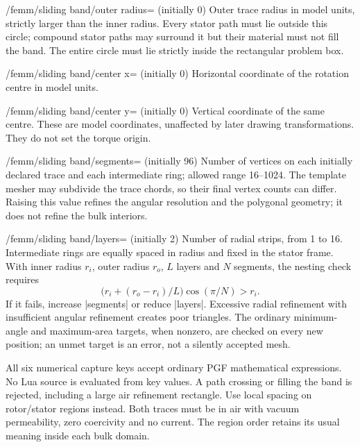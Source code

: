 \begin{key}{/femm/sliding band/outer radius= (initially 0)}
Outer trace radius in model units, strictly larger than the inner radius.
Every stator path must lie outside this circle; compound stator paths may
surround it but their material must not fill the band. The entire circle must
lie strictly inside the rectangular problem box.
\end{key}
\begin{key}{/femm/sliding band/center x= (initially 0)}
Horizontal coordinate of the rotation centre in model units.
\end{key}
\begin{key}{/femm/sliding band/center y= (initially 0)}
Vertical coordinate of the same centre. These are model coordinates, unaffected
by later drawing transformations. They do not set the torque origin.
\end{key}
\begin{key}{/femm/sliding band/segments= (initially 96)}
Number of vertices on each initially declared trace and each intermediate ring;
allowed range 16--1024. The template mesher may subdivide the trace chords,
so their final vertex counts can differ. Raising this value refines the angular
resolution and the polygonal geometry; it does not refine the bulk interiors.
\end{key}
\begin{key}{/femm/sliding band/layers= (initially 2)}
Number of radial strips, from 1 to 16. Intermediate rings are equally spaced
in radius and fixed in the stator frame. With inner radius $r_i$, outer radius
$r_o$, $L$ layers and $N$ segments, the nesting check requires
\[
 \bigl(r_i+(r_o-r_i)/L\bigr)\cos(\pi/N)>r_i.
\]
If it fails, increase |segments| or reduce |layers|. Excessive radial refinement
with insufficient angular refinement creates poor triangles. The ordinary
minimum-angle and maximum-area targets, when nonzero, are checked on every
new position; an unmet target is an error, not a silently accepted mesh.
\end{key}
All six numerical capture keys accept ordinary PGF mathematical expressions.
No Lua source is evaluated from key values. A path crossing or filling the band
is rejected, including a large air refinement rectangle. Use local spacing
on rotor/stator regions instead. Both traces must be in air with vacuum
permeability, zero coercivity and no current. The region order retains its
usual meaning inside each bulk domain.

